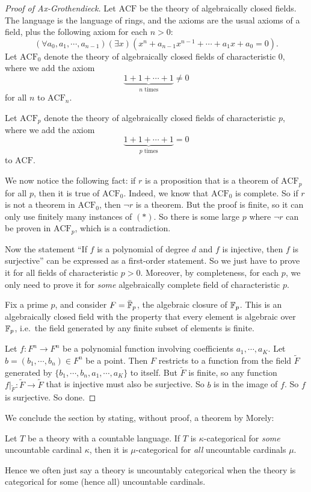 \documentclass[a4paper]{article}
\begin{document}
\begin{own}
\begin{proof}[Proof of Ax-Grothendieck]
    Let $\mathrm{ACF}$ be the theory of algebraically closed fields. The language is the language of rings, and the axioms are the usual axioms of a field, plus the following axiom for each $n > 0$:
    \[
      (\forall a_0, a_1, \cdots, a_{n - 1})(\exists x)(x^n + a_{n - 1}x^{n - 1} + \cdots + a_1 x + a_0 = 0).
    \]
    Let $\mathrm{ACF}_0$ denote the theory of algebraically closed fields of characteristic $0$, where we add the axiom
    \[
      \underbrace{1 + 1 + \cdots + 1}_{n\text{ times}} \not= 0\tag{$*$}
    \]
    for all $n$ to $\mathrm{ACF}_n$.

    Let $\mathrm{ACF}_p$ denote the theory of algebraically closed fields of characteristic $p$, where we add the axiom
    \[
      \underbrace{1 + 1 + \cdots + 1}_{p\text{ times}} = 0
    \]
    to $\mathrm{ACF}$.

    We now notice the following fact: if $r$ is a proposition that is a theorem of $\mathrm{ACF}_p$ for all $p$, then it is true of $\mathrm{ACF}_0$. Indeed, we know that $\mathrm{ACF}_0$ is complete. So if $r$ is not a theorem in $\mathrm{ACF}_0$, then $\neg r$ is a theorem. But the proof is finite, so it can only use finitely many instances of $(*)$. So there is some large $p$ where $\neg r$ can be proven in $\mathrm{ACF}_p$, which is a contradiction.

    Now the statement ``If $f$ is a polynomial of degree $d$ and $f$ is injective, then $f$ is surjective'' can be expressed as a first-order statement. So we just have to prove it for all fields of characteristic $p > 0$. Moreover, by completeness, for each $p$, we only need to prove it for \emph{some} algebraically complete field of characteristic $p$.

    Fix a prime $p$, and consider $F = \bar{\mathbb{F}}_p$, the algebraic closure of $\mathbb{F}_p$. This is an algebraically closed field with the property that every element is algebraic over $\mathbb{F}_p$, i.e.\ the field generated by any finite subset of elements is finite.

    Let $f: F^n \to F^n$ be a polynomial function involving coefficients $a_1, \cdots, a_K$. Let $b = (b_1, \cdots, b_n) \in F^n$ be a point. Then $F$ restricts to a function from the field $\tilde{F}$ generated by $\{b_1, \cdots, b_n, a_1, \cdots, a_K\}$ to itself. But $\tilde{F}$ is finite, so any function $f|_{\tilde{F}}: \tilde{F} \to \tilde{F}$ that is injective must also be surjective. So $b$ is in the image of $f$. So $f$ is surjective. So done.
  \end{proof}

  We conclude the section by stating, without proof, a theorem by Morely:
  \begin{thm}
    Let $T$ be a theory with a countable language. If $T$ is $\kappa$-categorical for \emph{some} uncountable cardinal $\kappa$, then it is $\mu$-categorical for \emph{all} uncountable cardinals $\mu$.
  \end{thm}
  Hence we often just say a theory is uncountably categorical when the theory is categorical for some (hence all) uncountable cardinals.
\end{own}
\end{document}
